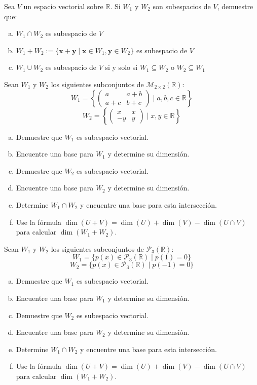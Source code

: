 \begin{prob} Sea $V$ un espacio vectorial sobre $\mathbb{R}$. Si $W_1$ y $W_2$ son subespacios de $V$, demuestre que:
\begin{enumerate}[(a)]
\item $W_1 \cap W_2$ es subespacio de $V$
\item $W_1 + W_2 := \{\mathbf{x} + \mathbf{y} \mid \mathbf{x} \in W_1, \mathbf{y} \in W_2\}$ es subespacio de $V$
\item $W_1 \cup W_2$ es subespacio de $V$ si y solo si $W_1 \subseteq W_2$ o $W_2 \subseteq W_1$
\end{enumerate}
\end{prob}

\begin{prob} Sean $W_1$ y $W_2$ los siguientes subconjuntos de $\mathcal{M}_{2 \times 2}(\mathbb{R})$:
$$W_1 = \left\{\begin{pmatrix} a & a+b \\ a+c & b+c \end{pmatrix} \mid a, b, c \in \mathbb{R}\right\}$$
$$W_2 = \left\{\begin{pmatrix} x & x \\ -y & y \end{pmatrix} \mid x, y \in \mathbb{R}\right\}$$

\begin{enumerate}[(a)]
\item Demuestre que $W_1$ es subespacio vectorial.
\item Encuentre una base para $W_1$ y determine su dimensión.
\item Demuestre que $W_2$ es subespacio vectorial.
\item Encuentre una base para $W_2$ y determine su dimensión.
\item Determine $W_1 \cap W_2$ y encuentre una base para esta intersección.
\item Use la fórmula $\dim(U + V) = \dim(U) + \dim(V) - \dim(U \cap V)$ para calcular $\dim(W_1 + W_2)$.
\end{enumerate}
\end{prob}

\begin{prob} Sean $W_1$ y $W_2$ los siguientes subconjuntos de $\mathcal{P}_3(\mathbb{R})$:
$$W_1 = \{p(x) \in \mathcal{P}_3(\mathbb{R}) \mid p(1) = 0\}$$
$$W_2 = \{p(x) \in \mathcal{P}_3(\mathbb{R}) \mid p(-1) = 0\}$$

\begin{enumerate}[(a)]
\item Demuestre que $W_1$ es subespacio vectorial.
\item Encuentre una base para $W_1$ y determine su dimensión.
\item Demuestre que $W_2$ es subespacio vectorial.
\item Encuentre una base para $W_2$ y determine su dimensión.
\item Determine $W_1 \cap W_2$ y encuentre una base para esta intersección.
\item Use la fórmula $\dim(U + V) = \dim(U) + \dim(V) - \dim(U \cap V)$ para calcular $\dim(W_1 + W_2)$.
\end{enumerate}
\end{prob}

